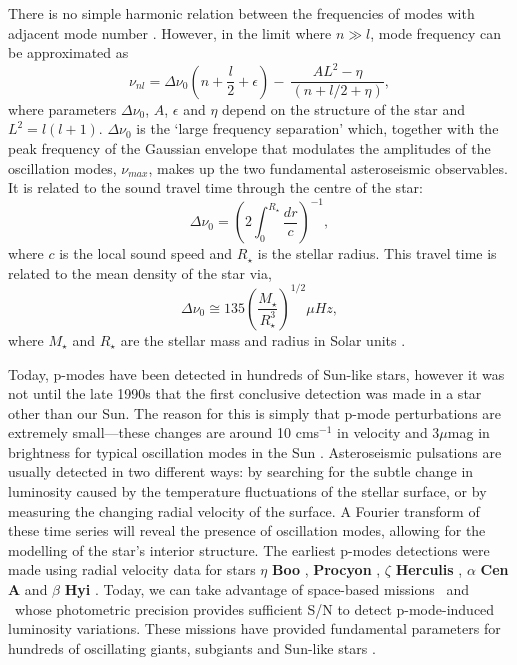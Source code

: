There is no simple harmonic relation between the frequencies of modes with
adjacent mode number \citep{Brown1994}.
However, in the limit where $n \gg l$, mode frequency can be approximated as
\begin{equation}
    \nu_{nl} = \Delta\nu_0\left(n + \frac{l}{2} + \epsilon \right) - \
    \frac{AL^2 - \eta}{(n + l/2 + \eta)},
\end{equation}
where parameters $\Delta\nu_0$, $A$, $\epsilon$ and $\eta$ depend on the
structure of the star and $L^2 = l(l+1)$.
$\Delta\nu_0$ is the `large frequency separation' which, together with the
peak frequency of the Gaussian envelope that modulates the amplitudes of the
oscillation modes, $\nu_{max}$, makes up the two fundamental asteroseismic
observables.
It is related to the sound travel time through the centre of the star:
\begin{equation}
\Delta\nu_0 = \left(2\int_0^{R_\star}\frac{dr}{c}\right)^{-1},
\end{equation}
where $c$ is the local sound speed and $R_\star$ is the stellar radius.
This travel time is related to the mean density of the star via,
\begin{equation}
\Delta\nu_0 \cong 135\left(\frac{M_\star}{R_\star^3}\right)^{1/2}\mu Hz,
\end{equation}
where $M_\star$ and $R_\star$ are the stellar mass and radius in Solar units
\citep{Cox1980, Brown2000}.

Today, p-modes have been detected in hundreds of Sun-like stars, however it
was not until the late 1990s that the first conclusive detection was made in
a star other than our Sun.
The reason for this is simply that p-mode perturbations are extremely
small---these changes are around 10 cms$^{-1}$ in velocity and 3$\mu$mag in
brightness for typical oscillation modes in the Sun \citep{Brown2000}.
Asteroseismic pulsations are usually detected in two different ways: by
searching for the subtle change in luminosity caused by the temperature
fluctuations of the stellar surface, or by measuring the changing radial
velocity of the surface.
A Fourier transform of these time series will reveal the presence of
oscillation modes, allowing for the modelling of the star's interior
structure.
The earliest p-modes detections were made using radial velocity data
\citep{Kjeldsen2001} for stars $\eta$ {\bf Boo} \citep{Kjeldsen1995}, {\bf
Procyon} \citep{Barban1999, Martic1999}, $\zeta$ {\bf Herculis}
\citep{Martic2001}, $\alpha$ {\bf Cen A} \citep{Kjeldsen1999} and $\beta$ {\bf
Hyi} \citep{Bedding2001}.
Today, we can take advantage of space-based missions \kepler\ and \corot\
whose photometric precision provides sufficient S/N to detect
p-mode-induced luminosity variations.
These missions have provided fundamental parameters for hundreds of
oscillating giants, subgiants and Sun-like stars \citep[e.g.][]{Michel2008,
Bruntt2009, Chaplin2014}.

